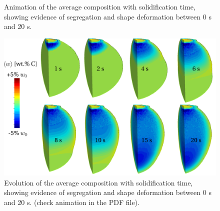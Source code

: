 \begin{figure}[htbp]
\centering
%
%
  {%
    \caption{Animation of the average composition with solidification time, showing evidence of segregation and shape deformation between 0 s and 20 s.}
  }
  {%
    \includegraphics[width=1.0\textwidth]{Chapter5/Graphics/3d/bin/mesosegregation.pdf}
    \caption{Evolution of the average composition with solidification time, showing evidence of segregation and shape deformation between 0 s and 20 s.
     (check animation in the PDF file).} 
  }
\label{fig:texus_mesosegregation}
\end{figure}

